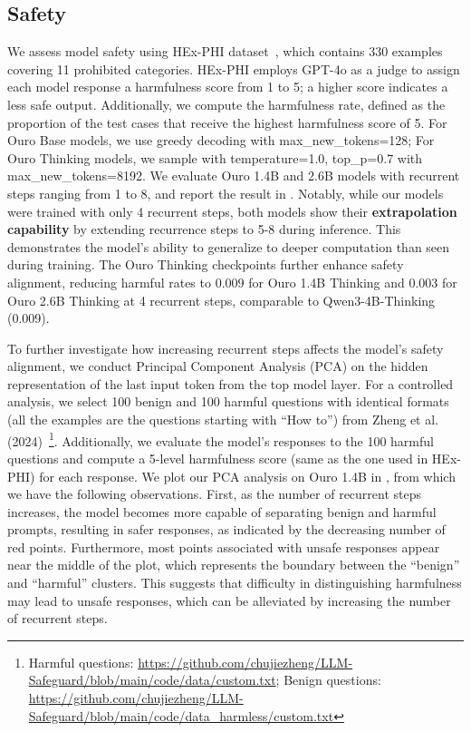 \documentclass[]{bytedance_seed}
\newcommand{\1}{\mathbf{1}}
\begin{document}
{\subsection{Safety}
\label{sec:safety}
We assess model safety using HEx-PHI dataset~\citep{qifine}, which contains 330 examples covering 11 prohibited categories. HEx-PHI employs GPT-4o as a judge to assign each model response a harmfulness score from 1 to 5; a higher score indicates a less safe output. Additionally, we compute the harmfulness rate, defined as the proportion of the test cases that receive the highest harmfulness score of 5.  For Ouro Base models, we use greedy decoding with max\_new\_tokens=128; For Ouro Thinking models, we sample with temperature=1.0, top\_p=0.7 with max\_new\_tokens=8192.
We evaluate Ouro 1.4B and 2.6B models with recurrent steps ranging from 1 to 8, and report the result in . Notably, while our models were trained with only 4 recurrent steps, both models show their \textbf{extrapolation capability} by extending recurrence steps to 5-8 during inference. This demonstrates the model's ability to generalize to deeper computation than seen during training. The Ouro Thinking checkpoints further enhance safety alignment, reducing harmful rates to 0.009 for Ouro 1.4B Thinking and 0.003 for Ouro 2.6B Thinking at 4 recurrent steps, comparable to Qwen3-4B-Thinking (0.009).



To further investigate how increasing recurrent steps affects the model’s safety alignment, we conduct Principal Component Analysis (PCA) on the hidden representation of the last input token from the top model layer. For a controlled analysis, we select 100 benign and 100 harmful questions with identical formats (all the examples are the questions starting with ``How to'') from Zheng et al.(2024)~\citep{zheng2024prompt}\footnote{Harmful questions: \url{https://github.com/chujiezheng/LLM-Safeguard/blob/main/code/data/custom.txt}; Benign questions: \url{https://github.com/chujiezheng/LLM-Safeguard/blob/main/code/data_harmless/custom.txt}}. Additionally, we evaluate the model’s responses to the 100 harmful questions and compute a 5-level harmfulness score (same as the one used in HEx-PHI) for each response. We plot our PCA analysis on Ouro 1.4B in , from which we have the following observations. First, as the number of recurrent steps increases, the model becomes more capable of separating benign and harmful prompts, resulting in safer responses, as indicated by the decreasing number of red points. Furthermore, most points associated with unsafe responses appear near the middle of the plot, which represents the boundary between the ``benign'' and ``harmful'' clusters. This suggests that difficulty in distinguishing harmfulness may lead to unsafe responses, which can be alleviated by increasing the number of recurrent steps. 



}
\end{document}
